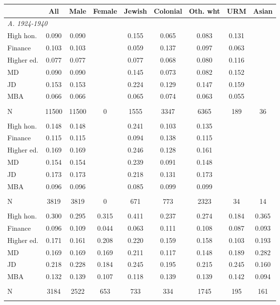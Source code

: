 \begin{tabular}{l*{8}{c}}
& All& Male& Female& Jewish& Colonial& Oth. wht& URM& Asian\\
\midrule
\multicolumn{3}{l}{\emph{A. 1924-1940}}\\
High hon.	&    0.090	&    0.090	&	&    0.155	&    0.065	&    0.083	&    0.131	&\\
Finance	&    0.103	&    0.103	&	&    0.059	&    0.137	&    0.097	&    0.063	&\\
Higher ed.	&    0.077	&    0.077	&	&    0.077	&    0.068	&    0.080	&    0.116	&\\
MD	&    0.090	&    0.090	&	&    0.145	&    0.073	&    0.082	&    0.152	&\\
JD	&    0.153	&    0.153	&	&    0.224	&    0.129	&    0.147	&    0.159	&\\
MBA	&    0.066	&    0.066	&	&    0.065	&    0.074	&    0.063	&    0.055	&\\
\\
N&    11500&    11500&        0&     1555&     3347&     6365&      189&       36\\ \addlinespace
\multicolumn{3}{l}{\emph{B. 1945-1965 (5-year intervals)}}\\
High hon.	&    0.148	&    0.148	&	&    0.241	&    0.103	&    0.135	&	&\\
Finance	&    0.115	&    0.115	&	&    0.094	&    0.138	&    0.115	&	&\\
Higher ed.	&    0.169	&    0.169	&	&    0.246	&    0.128	&    0.161	&	&\\
MD	&    0.154	&    0.154	&	&    0.239	&    0.091	&    0.148	&	&\\
JD	&    0.173	&    0.173	&	&    0.218	&    0.131	&    0.173	&	&\\
MBA	&    0.096	&    0.096	&	&    0.085	&    0.099	&    0.099	&	&\\
\\
N&     3819&     3819&        0&      671&      773&     2323&       34&       14\\ \addlinespace
\multicolumn{3}{l}{\emph{C. 1970-1990 (5-year intervals)}}\\
High hon.	&    0.300	&    0.295	&    0.315	&    0.411	&    0.237	&    0.274	&    0.184	&    0.365\\
Finance	&    0.096	&    0.109	&    0.044	&    0.063	&    0.111	&    0.108	&    0.087	&    0.093\\
Higher ed.	&    0.171	&    0.161	&    0.208	&    0.220	&    0.159	&    0.158	&    0.103	&    0.193\\
MD	&    0.169	&    0.169	&    0.169	&    0.211	&    0.117	&    0.148	&    0.189	&    0.282\\
JD	&    0.218	&    0.228	&    0.184	&    0.245	&    0.195	&    0.215	&    0.245	&    0.160\\
MBA	&    0.132	&    0.139	&    0.107	&    0.118	&    0.139	&    0.139	&    0.142	&    0.094\\
\\
N&     3184&     2522&      653&      733&      334&     1745&      195&      161\\ \addlinespace
\bottomrule
\end{tabular}